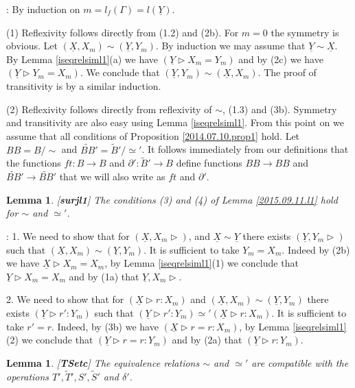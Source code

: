 \documentclass[11pt]{article}
\newenvironment{proof}{{\bf Proof}:}{\vskip 5mm }
\newtheorem{lemma}[proposition]{Lemma}
\newcommand{\llabel}[1]{\label{#1}[{\bf #1}]}
\newcommand{\sr}{\rightarrow}
\newcommand{\uu}{\underline}
\newcommand{\wt}{\widetilde}
\begin{document}
%
\begin{proof}
By induction on $m=l_f(\Gamma)=l(\uu{Y})$. 

(1) Reflexivity follows directly from (1.2) and (2b). For $m=0$ the symmetry is obvious. Let $(\uu{X},X_m)\sim(\uu{Y},Y_m)$. By induction we may assume that $\uu{Y}\sim\uu{X}$. By Lemma \ref{iseqrelsiml1}(a) we have $(\uu{Y}\rhd X_m=Y_m)$ and by (2c) we have $(\uu{Y}\rhd Y_m=X_m)$. We conclude that $(\uu{Y},Y_m)\sim(\uu{X},X_m)$.  The proof of transitivity is by a similar induction.

(2) Reflexivity follows directly from  reflexivity of $\sim$, (1.3) and (3b). Symmetry and transitivity are also easy using Lemma \ref{iseqrelsiml1}.
\end{proof}
%
From this point on we assume that all conditions of Proposition \ref{2014.07.10.prop1}  hold. Let $BB=B/\sim$ and $\wt{BB}'=\wt{B}'/\simeq'$. It follows immediately from our definitions that the functions $ft:B\sr B$ and $\partial':\wt{B}'\sr B$ define functions $BB\sr BB$ and $\wt{BB}'\sr \wt{BB}'$ that we will also write as $ft$ and $\partial'$. 
%
\begin{lemma}
\llabel{surjl1}
The conditions (3) and (4) of Lemma \ref{2015.09.11.l1} hold for $\sim$ and $\simeq'$.
\end{lemma}
%
\begin{proof}
1. We need to show that for $(\uu{X},X_m\rhd)$, and $\uu{X}\sim\uu{Y}$ there exists $(\uu{Y},Y_m\rhd)$ such that $(\uu{X},X_m)\sim(\uu{Y},Y_m)$. It is sufficient to take $Y_m=X_m$. Indeed by (2b) we have $\uu{X}\rhd X_m=X_m$, by Lemma \ref{iseqrelsiml1}(1) we conclude that $\uu{Y}\rhd X_m=X_m$ and by (1a) that $\uu{Y},X_m\rhd$.  

2.  We need to show that for $(\uu{X}\rhd r:X_m)$ and $(\uu{X},X_m)\sim(\uu{Y},Y_m)$ there exists $(\uu{Y}\rhd r':Y_m)$ such that $(\uu{Y}\rhd r':Y_m)\simeq'(\uu{X}\rhd r:X_m)$. It is sufficient to take $r'=r$. Indeed, by (3b) we have $(\uu{X}\rhd r=r:X_m)$, by Lemma \ref{iseqrelsiml1}(2) we conclude that $(\uu{Y}\rhd r=r:Y_m)$ and by (2a) that $(\uu{Y}\rhd r:Y_m)$. 
\end{proof}
%
\begin{lemma}
\llabel{TSetc}
The equivalence relations $\sim$ and $\simeq'$ are compatible with the operations $T',\wt{T}',S',\wt{S}'$ and $\delta'$.
\end{lemma}
%
\end{document}
